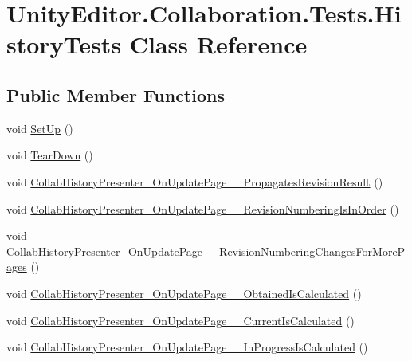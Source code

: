 \hypertarget{class_unity_editor_1_1_collaboration_1_1_tests_1_1_history_tests}{}\section{Unity\+Editor.\+Collaboration.\+Tests.\+History\+Tests Class Reference}
\label{class_unity_editor_1_1_collaboration_1_1_tests_1_1_history_tests}
\subsection*{Public Member Functions}
\begin{DoxyCompactItemize}
\item 
void \mbox{\hyperlink{class_unity_editor_1_1_collaboration_1_1_tests_1_1_history_tests_a0de6dabc680e9f81db2fa178d28b468b}{Set\+Up}} ()
\item 
void \mbox{\hyperlink{class_unity_editor_1_1_collaboration_1_1_tests_1_1_history_tests_a024058e10acbe18cb317bf9523344f1d}{Tear\+Down}} ()
\item 
void \mbox{\hyperlink{class_unity_editor_1_1_collaboration_1_1_tests_1_1_history_tests_ad4220c5ddcc5108da0e0fc981ff8820a}{Collab\+History\+Presenter\+\_\+\+On\+Update\+Page\+\_\+\+\_\+\+Propagates\+Revision\+Result}} ()
\item 
void \mbox{\hyperlink{class_unity_editor_1_1_collaboration_1_1_tests_1_1_history_tests_a12b83c66d15d69998918dfe8e97b9ae1}{Collab\+History\+Presenter\+\_\+\+On\+Update\+Page\+\_\+\+\_\+\+Revision\+Numbering\+Is\+In\+Order}} ()
\item 
void \mbox{\hyperlink{class_unity_editor_1_1_collaboration_1_1_tests_1_1_history_tests_ab0bd337488a44ee295054a751a32cc3c}{Collab\+History\+Presenter\+\_\+\+On\+Update\+Page\+\_\+\+\_\+\+Revision\+Numbering\+Changes\+For\+More\+Pages}} ()
\item 
void \mbox{\hyperlink{class_unity_editor_1_1_collaboration_1_1_tests_1_1_history_tests_a9ad904abce79865d1feebf5f337e3a45}{Collab\+History\+Presenter\+\_\+\+On\+Update\+Page\+\_\+\+\_\+\+Obtained\+Is\+Calculated}} ()
\item 
void \mbox{\hyperlink{class_unity_editor_1_1_collaboration_1_1_tests_1_1_history_tests_a45b12a9d036280b64a6c25f72abf792f}{Collab\+History\+Presenter\+\_\+\+On\+Update\+Page\+\_\+\+\_\+\+Current\+Is\+Calculated}} ()
\item 
void \mbox{\hyperlink{class_unity_editor_1_1_collaboration_1_1_tests_1_1_history_tests_a1e69af11c0eb28aaa611b779db0ee97f}{Collab\+History\+Presenter\+\_\+\+On\+Update\+Page\+\_\+\+\_\+\+In\+Progress\+Is\+Calculated}} ()

\end{DoxyCompactItemize}

